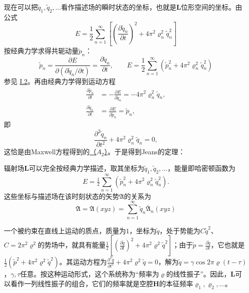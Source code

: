 \documentclass[fontsize=13pt,twoside,openany,headings=normal,parskip=false,bookmarkpackage=false,DIV=calc]{scrbook}
\begin{document}
现在可以把$\widetilde q_1,\allowbreak \widetilde q_2,\allowbreak \ldots$看作描述场的瞬时状态的坐标，也就是$\boldsymbol{L}$位形空间的坐标。\hypertarget{origpage-139}{}\label{origpage-139}由公式
\[
 E=\frac12\sum_{n=1}^{\infty}
 \left[\left(\frac{\partial\widetilde q_n}{\partial t}\right)^2
 +4\pi^2\varrho_n^2\widetilde q_n^2\right]
\]
按经典力学求得共轭动量$\widetilde p_n$：
\[
 \widetilde p_n=\frac{\partial E}{\partial(\partial\widetilde q_n/\partial t)}
 =\frac{\partial\widetilde q_n}{\partial t},\qquad
 E=\frac12\sum_{n=1}^{\infty}(\widetilde p_n^2+4\pi^2\varrho_n^2\widetilde q_n^2)
\]
参见 \hyperref[sec:I.2]{I.2}。再由经典力学得到运动方程
\begin{align*}
 \frac{\partial\widetilde p_n}{\partial t}
 &=-\frac{\partial E}{\partial\widetilde q_n}=-4\pi^2\varrho_n^2\widetilde q_n,\\
 \frac{\partial\widetilde q_n}{\partial t}
 &=\frac{\partial E}{\partial\widetilde p_n}=\widetilde p_n,
\end{align*}
即
\[
 \frac{\partial^2\widetilde q_n}{\partial t^2}+4\pi^2\varrho_n^2\widetilde q_n=0,
\]
这恰是由Maxwell方程得到的\CJKglue \hyperref[eq:III.6.A2]{（$A_2$）}。于是得到Jeans的定理：

辐射场$\boldsymbol{L}$可以完全按经典力学描述，取其坐标为$\widetilde q_1,\allowbreak \widetilde q_2,\allowbreak \ldots$，能量即哈密顿函数为
\[
 E=\tfrac12\sum_{n=1}^{\infty}(\widetilde p_n^2+4\pi^2\varrho_n^2\widetilde q_n^2).
\]
这些坐标与描述场在该时刻状态的矢势$\mathfrak A$的关系为
\[
 \mathfrak A=\mathfrak A(xyz)=\sum_{n=1}^{\infty}\widetilde q_n\overline{\mathfrak A}_n(xyz)
\]

一个被约束在直线上运动的质点，质量为$1$，坐标为$\widetilde q$，处于势能为$C\widetilde q^2$、$C=2\pi^2\varrho^2$的势场中，就具有能量$\frac12[(\frac{\partial\widetilde q}{\partial t})^2+4\pi^2\varrho^2\widetilde q^2]$；由于$\widetilde p=\frac{\partial\widetilde q}{\partial t}$，它也就是$\frac12(\widetilde p^2+4\pi^2\varrho^2\widetilde q^2)$。其运动方程为$\frac{\partial^2\widetilde q}{\partial t^2}+4\pi^2\varrho^2\widetilde q=0$，解为$\widetilde q=\gamma\cos2\pi\varrho(t-\tau)$，$\gamma,\allowbreak \tau$任意。按这种运动形式，这个系统称为“频率为$\varrho$的线性振子”。因此，$\boldsymbol{L}$可以看作一列线性振子的组合，它们的频率就是空腔$\boldsymbol H$的本征频率$\varrho_1,\allowbreak \varrho_2,\allowbreak \ldots$。
\end{document}
